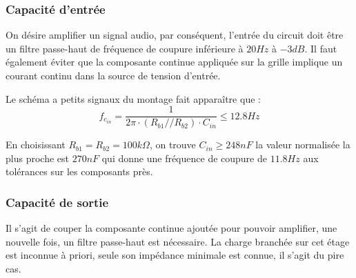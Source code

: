 \documentclass[11pt,a4paper]{article}
\theoremstyle{definition}%
\begin{document}
{%




\subsubsection{Capacité d'entrée}
On désire amplifier un signal audio, par conséquent, l'entrée du circuit doit être un filtre passe-haut de fréquence de coupure inférieure à $20Hz$ à $-3dB$. Il faut également éviter que la composante continue appliquée sur la grille implique un courant continu dans la source de tension d'entrée.

Le schéma a petits signaux du montage fait apparaître que :
$$f_{c_{in}}=\frac{1}{2\pi\cdot\left(R_{b1}//R_{b2}\right)\cdot C_{in}}\leq 12.8Hz$$

En choisissant $R_{b1}=R_{b2}=100 k\Omega$, on trouve $C_{in}\geq 248nF$ la valeur normalisée la plus proche est $270nF$ qui donne une fréquence de coupure de $11.8Hz$ aux tolérances sur les composants près.

\begin{center}
\end{center}



\subsubsection{Capacité de sortie}
Il s'agit de couper la composante continue ajoutée pour pouvoir amplifier, une nouvelle fois, un filtre passe-haut est nécessaire.
La charge branchée sur cet étage est inconnue à priori, seule son impédance minimale est connue,  il s'agit du pire cas.

}
\end{document}
